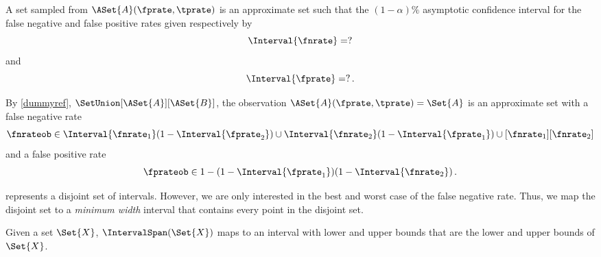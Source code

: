 \documentclass[ ../main.tex]{subfiles}
\begin{document}
A set sampled from $\ASet{A}(\fprate,\tprate)$ is an approximate set such that 
the $(1-\alpha)\%$ asymptotic confidence interval for the false negative and 
false positive rates given respectively by
\begin{equation}
\label{eq:fnrate_union_set}
\Interval{\fnrate} = ?
\end{equation}
and
\begin{equation}
\label{eq:fprate_union_set}
\Interval{\fprate} = ?\,.
\end{equation}


By \cref{dummyref}, $\SetUnion[\ASet{A}][\ASet{B}]$, the observation 
$\ASet{A}(\fprate,\tprate) = \Set{A}$ is an approximate set with a false 
negative rate
\begin{equation}
\label{eq:fnrate_union_set}
\fnrateob \in \Interval{\fnrate_1}(1 - \Interval{\fprate_2}) \cup  
\Interval{\fnrate_2} 
(1 - \Interval{\fprate_1}) \cup [\fnrate_1][\fnrate_2]
\end{equation}
and a false positive rate
\begin{equation}
\label{eq:fprate_union_set}
\fprateob \in 1 - (1 - \Interval{\fprate_1})(1 - \Interval{\fnrate_2})\,.
\end{equation}

 represents a disjoint set of intervals.
However, we  are only interested in the best and worst case of the false negative rate.
Thus, we map the disjoint set to a \emph{minimum width} interval that contains every point in the disjoint set.
\begin{definition}
	Given a set $\Set{X}$, $\IntervalSpan(\Set{X})$ maps to an interval with 
	lower and upper bounds that are the lower and upper bounds of $\Set{X}$.
\end{definition}
\end{document}
